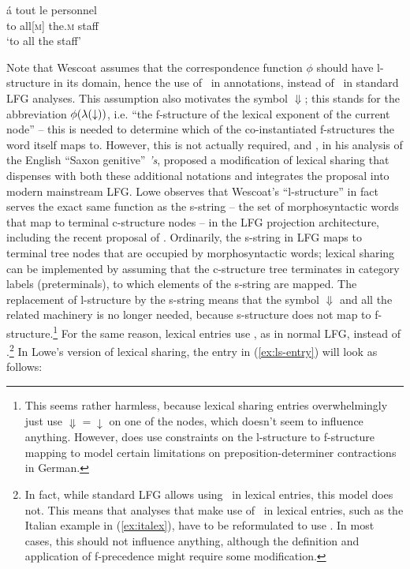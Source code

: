 \documentclass[output=paper,hidelinks]{langscibook}
\begin{document}
 \ea\label{ex:ls-correct}
 \gll \'a tout le personnel\\
 to all[\textsc{m}] the.\textsc{m} staff\\
 \glt `to all the staff'
 \z
 
 
 
 Note that Wescoat assumes that the correspondence function $\phi$ should have l-structure in its domain, hence the use of \DOWN\ in annotations, instead of \UP\ in standard LFG analyses. This assumption also motivates the symbol $\Downarrow$; this stands for the abbreviation $\phi(\lambda(\mbox{$\downarrow$}{}))$, i.e. ``the f-structure of the lexical exponent of the current node'' -- this is needed to determine which of the co-instantiated f-structures the word itself maps to. However, this is not actually required, and \textcite{lowe2015clitic}, in his analysis of the English ``Saxon genitive'' \textit{'s}, proposed a modification of lexical sharing that dispenses with both these additional notations and integrates the proposal into modern mainstream LFG. Lowe observes that Wescoat's ``l-structure'' in fact serves the exact same function as the s-string -- the set of morphosyntactic words that map to terminal c-structure nodes -- in the LFG projection architecture, including the recent proposal of \textcite{DM11}. Ordinarily, the s-string in LFG maps to terminal tree nodes that are occupied by morphosyntactic words; lexical sharing can be implemented by assuming that the c-structure tree terminates in category labels (preterminals), to which elements of the s-string are mapped. The replacement of l-structure by the s-string means that the symbol $\Downarrow$ and all the related machinery is no longer needed, because s-structure does not map to f-structure.\footnote{This seems rather harmless, because lexical sharing entries overwhelmingly just use $\Downarrow=\downarrow$ on one of the nodes, which doesn't seem to influence anything. However, \textcite{wescoat2007} does use constraints on the l-structure to f-structure mapping to model certain limitations on preposition-determiner contractions in German.} For the same reason, lexical entries use \UP, as in normal LFG, instead of \DOWN.\footnote{In fact, while standard LFG allows using \DOWN\ in lexical entries, this model does not. This means that analyses that make use of \DOWN\ in lexical entries, such as the Italian example in (\ref{ex:italex}), have to be reformulated to use \UP. In most cases, this should not influence anything, although the definition and application of f-precedence might require some modification.} In Lowe's version of lexical sharing, the entry in (\ref{ex:ls-entry}) will look as follows:
 
\end{document}
